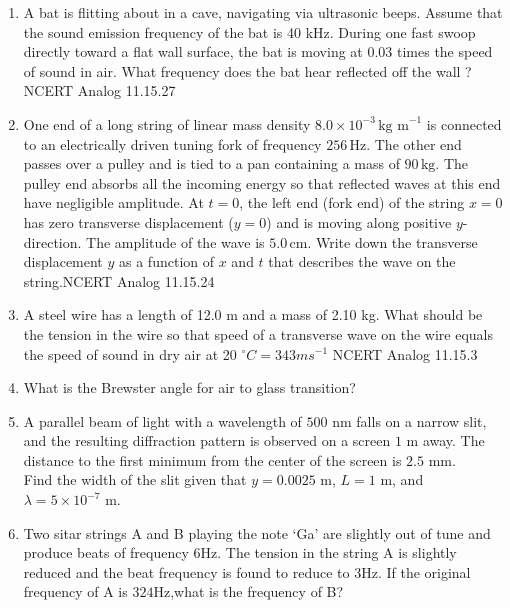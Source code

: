 \begin{enumerate}[label=\thesection.\arabic*,ref=\thesection.\theenumi]
\item A bat is flitting about in a cave, navigating via ultrasonic beeps. Assume that the
sound emission frequency of the bat is 40 kHz. During one fast swoop directly
toward a flat wall surface, the bat is moving at 0.03 times the speed of sound in air.
What frequency does the bat hear reflected off the wall ? \hfill{NCERT Analog 11.15.27}\\
\solution
\pagebreak
\item One end of a long string of linear mass density $8.0 \times 10^{-3} \, \text{kg m}^{-1}$ is connected to an electrically driven tuning fork of frequency $256 \, \text{Hz}$. The other end passes over a pulley and is tied to a pan containing a mass of $90 \, \text{kg}$. The pulley end absorbs all the incoming energy so that reflected waves at this end have negligible amplitude. At $t=0$, the left end (fork end) of the string $x=0$ has zero transverse displacement ($y=0$) and is moving along positive $y$-direction. The amplitude of the wave is $5.0 \, \text{cm}$. Write down the transverse displacement $y$ as a function of $x$ and $t$ that describes the wave on the string.\hfill{NCERT Analog 11.15.24} \\
\solution
\pagebreak
\item A steel wire has a length of 12.0 m and a mass of 2.10 kg. What should be the
tension in the wire so that speed of a transverse wave on the wire equals the speed
of sound in dry air at 20 $^{\circ} C = 343ms^{-1}$ \hfill{NCERT Analog 11.15.3}\\
\solution
\pagebreak
\item What is the Brewster angle for air to glass transition?\\
\solution
\pagebreak
\item A parallel beam of light with a wavelength of $500$ nm falls on a narrow slit, and the resulting diffraction pattern is observed on a screen $1$ m away. The distance to the first minimum from the center of the screen is $2.5$ mm.\\
Find the width of the slit given that $y = 0.0025$ m, $L = 1$ m, and $\lambda = 5 \times 10^{-7}$ m.\\
\solution
\pagebreak

\item Two sitar strings A and B playing the note `Ga' are slightly out of tune and produce beats of frequency $6$Hz. The tension in the string A is slightly reduced and the beat frequency is found to reduce to $3$Hz. If the original frequency of A is $324$Hz,what is the frequency of B?\\
\solution
\pagebreak
\end{enumerate}
